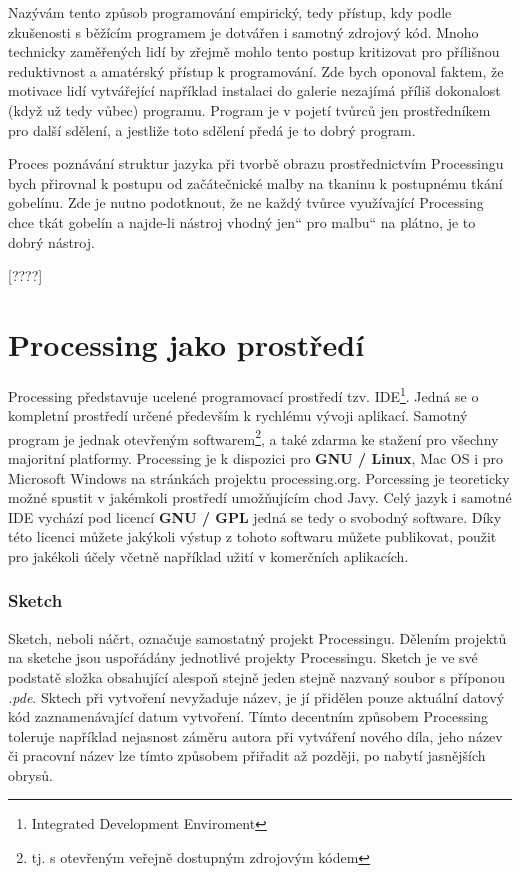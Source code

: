 \documentclass[10pt,twopage]{book}
\renewcommand\uv[1]{\quotedblbase #1\textquotedblleft}%
\newcommand{\pododdil}[1]{\subsection{#1}\label{subsec:#1}}
\newcommand{\slovnik}[1]{\textbf{\gls{#1}}\index{#1}}
\begin{document}
Nazývám tento způsob programování empirický, tedy přístup, kdy podle zkušenosti s běžícím programem je dotvářen i samotný zdrojový kód. Mnoho technicky zaměřených lidí by zřejmě mohlo tento postup kritizovat pro přílišnou reduktivnost a amatérský přístup k programování. Zde bych oponoval faktem, že motivace lidí vytvářející například instalaci do galerie nezajímá příliš dokonalost (když už tedy vůbec) programu. Program je v pojetí tvůrců jen prostředníkem pro další sdělení, a jestliže toto sdělení předá je to dobrý program.

Proces poznávání struktur jazyka při tvorbě obrazu prostřednictvím Processingu bych přirovnal k postupu od začátečnické malby na tkaninu k postupnému tkání gobelínu. Zde je nutno podotknout, že ne každý tvůrce využívající Processing chce tkát gobelín a najde-li nástroj vhodný \uv{jen} pro \uv{malbu} na plátno, je to dobrý nástroj.


[????]

\chapter{Processing jako prostředí}


Processing představuje ucelené programovací prostředí tzv. IDE\footnote{Integrated Development Enviroment}. Jedná se o kompletní prostředí určené především k rychlému vývoji aplikací. Samotný program je jednak otevřeným softwarem\footnote{tj. s otevřeným veřejně dostupným zdrojovým kódem}, a také zdarma ke stažení pro všechny majoritní platformy. Processing je k dispozici pro \slovnik{GNU / Linux}, Mac OS i pro Microsoft Windows na stránkách projektu processing.org. Porcessing je teoreticky možné spustit v jakémkoli prostředí umožňujícím chod Javy. Celý jazyk i samotné IDE vychází pod licencí \slovnik{GNU / GPL} jedná se tedy o svobodný software. Díky této licenci můžete jakýkoli výstup z tohoto softwaru můžete publikovat, použit pro jakékoli účely včetně například užití v komerčních aplikacích.


\pododdil{Sketch}

Sketch, neboli náčrt, označuje samostatný projekt Processingu. Dělením projektů na sketche jsou uspořádány jednotlivé projekty Processingu. Sketch je ve své podstatě složka obsahující alespoň stejně jeden stejně nazvaný soubor s příponou {\em *.pde}. Sktech při vytvoření nevyžaduje název, je jí přidělen pouze aktuální datový kód zaznamenávající datum vytvoření. Tímto decentním způsobem Processing toleruje například nejasnost záměru autora při vytváření nového díla, jeho název či pracovní název lze tímto způsobem přiřadit až později, po nabytí jasnějších obrysů.
\end{document}
